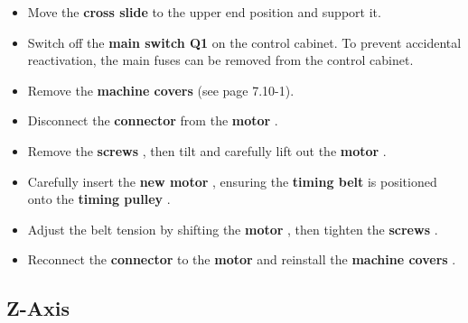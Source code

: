 \begin{itemize}
    \setlength{\itemsep}{0pt} \setlength{\parskip}{0pt}
    \item Move the \textbf{cross slide} to the upper end position and support it.
    \item Switch off the \textbf{main switch Q1} on the control cabinet.  
          To prevent accidental reactivation, the main fuses can be removed from the control cabinet.
    \item Remove the \textbf{machine covers } (see page 7.10-1).
    \item Disconnect the \textbf{connector } from the \textbf{motor }.
    \item Remove the \textbf{screws }, then tilt and carefully lift out the \textbf{motor }.
    \item Carefully insert the \textbf{new motor }, ensuring the \textbf{timing belt } is positioned onto the \textbf{timing pulley }.
    \item Adjust the belt tension by shifting the \textbf{motor }, then tighten the \textbf{screws }.
    \item Reconnect the \textbf{connector } to the \textbf{motor } and reinstall the \textbf{machine covers }.
\end{itemize}

\newpage

\subsection*{Z-Axis}


